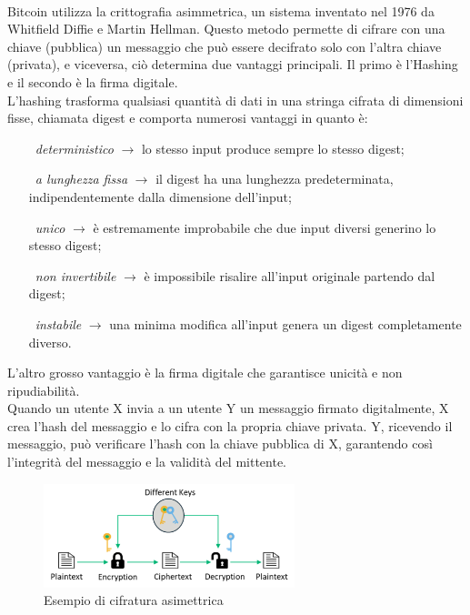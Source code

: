\\Bitcoin utilizza la crittografia asimmetrica, un sistema inventato nel 1976 da Whitfield Diffie e Martin Hellman. Questo metodo permette di cifrare con una chiave (pubblica) un messaggio che può essere decifrato solo con l’altra chiave (privata), e viceversa, ciò determina due vantaggi principali.
Il primo è l'Hashing e il secondo è la firma digitale.
\\L'hashing trasforma qualsiasi quantità di dati in una stringa cifrata di dimensioni fisse, chiamata digest e comporta numerosi vantaggi in quanto è: 
\vspace{1em}
\begin{adjustwidth}{1cm}{0pt}
    \begin{itemize}[itemsep=1.5ex]
        \item[\textbullet\ \textit{deterministico} $\rightarrow$ ] lo stesso input produce sempre lo stesso digest;
        \item [\textbullet\ \textit{a lunghezza fissa} $\rightarrow$ ] il digest ha una lunghezza predeterminata, indipendentemente dalla dimensione dell’input;
        \item [\textbullet\ \textit{unico} $\rightarrow$ ] è estremamente improbabile che due input diversi generino lo stesso digest;
        \item [\textbullet\ \textit{non invertibile} $\rightarrow$ ] è impossibile risalire all’input originale partendo dal digest;
        \item [\textbullet\ \textit{instabile} $\rightarrow$ ] una minima modifica all’input genera un digest completamente diverso.
    \end{itemize}
\end{adjustwidth}
\vspace{1em}
L'altro grosso vantaggio è la firma digitale che garantisce unicità e non ripudiabilità. 
\\Quando un utente X invia a un utente Y un messaggio firmato digitalmente, X crea l’hash del messaggio e lo cifra con la propria chiave privata. Y, ricevendo il messaggio, può verificare l’hash con la chiave pubblica di X, garantendo così l’integrità del messaggio e la validità del mittente.
\begin{figure}[h]
\centering
\includegraphics[width=0.65\textwidth]{Immagini/cifratura asimmetrica.png}
\caption{Esempio di cifratura asimettrica}
\end{figure}
